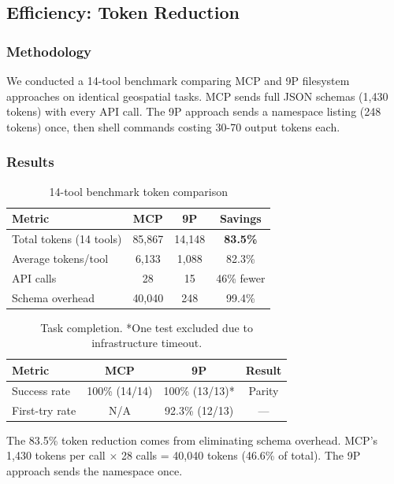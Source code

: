 \documentclass[acmsmall,screen,review]{acmart}
\begin{document}
\subsection{Efficiency: Token Reduction}

\subsubsection{Methodology}

We conducted a 14-tool benchmark comparing MCP and 9P filesystem approaches on identical geospatial tasks. MCP sends full JSON schemas (1,430 tokens) with every API call. The 9P approach sends a namespace listing (248 tokens) once, then shell commands costing 30-70 output tokens each.

\subsubsection{Results}

\begin{table}[h]
\centering
\begin{tabular}{lccc}
\hline
\textbf{Metric} & \textbf{MCP} & \textbf{9P} & \textbf{Savings} \\
\hline
Total tokens (14 tools) & 85,867 & 14,148 & \textbf{83.5\%} \\
Average tokens/tool & 6,133 & 1,088 & 82.3\% \\
API calls & 28 & 15 & 46\% fewer \\
Schema overhead & 40,040 & 248 & 99.4\% \\
\hline
\end{tabular}
\caption{14-tool benchmark token comparison}
\label{tab:tokens}
\end{table}

\begin{table}[h]
\centering
\begin{tabular}{lccc}
\hline
\textbf{Metric} & \textbf{MCP} & \textbf{9P} & \textbf{Result} \\
\hline
Success rate & 100\% (14/14) & 100\% (13/13)* & Parity \\
First-try rate & N/A & 92.3\% (12/13) & --- \\
\hline
\end{tabular}
\caption{Task completion. *One test excluded due to infrastructure timeout.}
\label{tab:success}
\end{table}

The 83.5\% token reduction comes from eliminating schema overhead. MCP's 1,430 tokens per call $\times$ 28 calls = 40,040 tokens (46.6\% of total). The 9P approach sends the namespace once.
\end{document}
